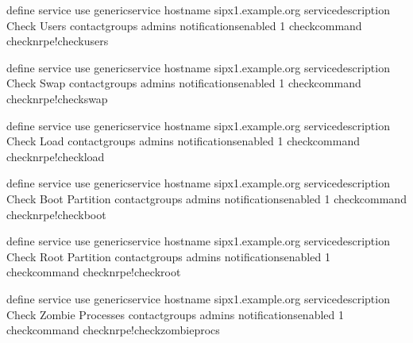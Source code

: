 \documentclass[letterpaper,10pt,english]{sphinxmanual}
\begin{document}
\begin{sphinxVerbatim}[commandchars=\\\{\}]
define service\PYGZob{}
        use                             generic\PYGZhy{}service
        host\PYGZus{}name                       sipx1.example.org
        service\PYGZus{}description             Check Users
        contact\PYGZus{}groups                  admins
        notifications\PYGZus{}enabled           1
        check\PYGZus{}command                   check\PYGZus{}nrpe!check\PYGZus{}users
        \PYGZcb{}

define service\PYGZob{}
        use                             generic\PYGZhy{}service
        host\PYGZus{}name                       sipx1.example.org
        service\PYGZus{}description             Check Swap
        contact\PYGZus{}groups                  admins
        notifications\PYGZus{}enabled           1
        check\PYGZus{}command                   check\PYGZus{}nrpe!check\PYGZus{}swap
        \PYGZcb{}

define service\PYGZob{}
        use                             generic\PYGZhy{}service
        host\PYGZus{}name                       sipx1.example.org
        service\PYGZus{}description             Check Load
        contact\PYGZus{}groups                  admins
        notifications\PYGZus{}enabled           1
        check\PYGZus{}command                   check\PYGZus{}nrpe!check\PYGZus{}load
        \PYGZcb{}

define service\PYGZob{}
        use                             generic\PYGZhy{}service
        host\PYGZus{}name                       sipx1.example.org
        service\PYGZus{}description             Check Boot Partition
        contact\PYGZus{}groups                  admins
        notifications\PYGZus{}enabled           1
        check\PYGZus{}command                   check\PYGZus{}nrpe!check\PYGZus{}boot
        \PYGZcb{}

define service\PYGZob{}
        use                             generic\PYGZhy{}service
        host\PYGZus{}name                       sipx1.example.org
        service\PYGZus{}description             Check Root Partition
        contact\PYGZus{}groups                  admins
        notifications\PYGZus{}enabled           1
        check\PYGZus{}command                   check\PYGZus{}nrpe!check\PYGZus{}root
        \PYGZcb{}

define service\PYGZob{}
        use                             generic\PYGZhy{}service
        host\PYGZus{}name                       sipx1.example.org
        service\PYGZus{}description             Check Zombie Processes
        contact\PYGZus{}groups                  admins
        notifications\PYGZus{}enabled           1
        check\PYGZus{}command                   check\PYGZus{}nrpe!check\PYGZus{}zombie\PYGZus{}procs
        \PYGZcb{}


\end{sphinxVerbatim}
\end{document}
